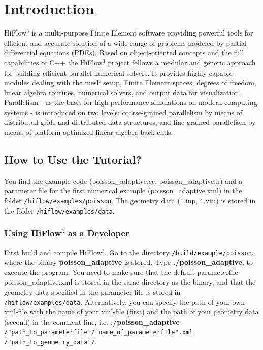 \documentclass[a4paper, 11pt, twoside]{article}
\begin{document}
\thispagestyle{empty}




\newcommand{\dd}{\mathrm{d}}
\newtheorem{remark}{Remark}[section]
\thispagestyle{empty}
\tableofcontents

\newpage
\pagestyle{plain}
\vspace{0.5cm}
\section{Introduction}

HiFlow$^3$ is a multi-purpose Finite Element software providing powerful tools for efficient and accurate solution of a wide range of problems modeled by partial differential equations (PDEs). Based on object-oriented concepts and the full capabilities of C++ the HiFlow$^3$ project follows a modular and generic approach for building efficient parallel numerical solvers. It provides highly capable modules dealing with the mesh setup, Finite Element spaces, degrees of freedom, linear algebra routines, numerical solvers, and output data for visualization. Parallelism - as the basis for high performance simulations on modern computing systems - is introduced on two levels: coarse-grained parallelism by means of distributed grids and distributed data structures, and fine-grained parallelism by means of platform-optimized linear algebra back-ends.

\subsection{How to Use the Tutorial?}
You find the example code (poisson\_adaptive.cc, poisson\_adaptive.h) and a parameter file for the first numerical example (poisson\_adaptive.xml) in the folder \verb'/hiflow/examples/poisson'. The geometry data (*.inp, *.vtu) is stored in the folder \verb'/hiflow/examples/data'.

\subsubsection{Using HiFlow$^3$ as a Developer}\label{sectiondeveloper}
First build and compile HiFlow$^3$. Go to the directory \verb'/build/example/poisson', where the binary \textbf{poisson\_adaptive} is stored. Type \textbf{./poisson\_adaptive}, to execute the program. 
You need to make sure that the default parameterfile poisson\_adaptive.xml is stored in the same directory as the binary, and that the geometry data specified in the parameter file is stored in \verb'/hiflow/examples/data'. Alternatively, you can specify the path of your own xml-file with the name of your xml-file (first) and the path of your geometry data (second) in the comment line, i.e. \textbf{./poisson\_adaptive} \verb'/"path_to_parameterfile"/"name_of_parameterfile".xml' \verb'/"path_to_geometry_data"/'.
\end{document}
